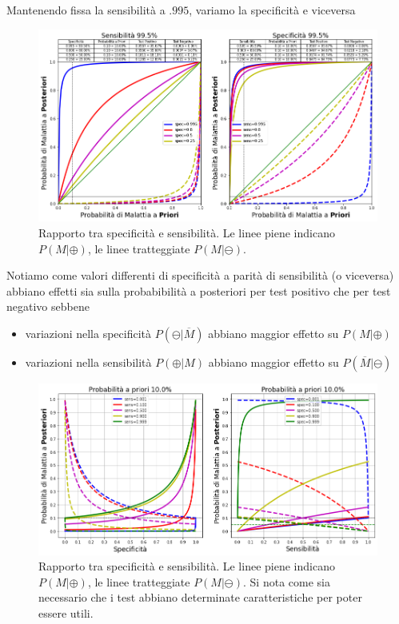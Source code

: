 \documentclass[11pt]{article}
\providecommand{\tightlist}{%
      \setlength{\itemsep}{0pt}\setlength{\parskip}{0pt}}
\begin{document}
    Mantenendo fissa la sensibilità a \(.995\), variamo la specificità e
viceversa

    
        \begin{figure}
        \centering
            \includegraphics{sens-spec.png}
            \caption{Rapporto tra specificità e sensibilità. Le linee piene indicano $P(M|\oplus)$, le linee tratteggiate $P(M|\ominus).$}
            \label{fig:sens-spec}
        \end{figure}

    
    Notiamo come valori differenti di specificità a parità di sensibilità (o
viceversa) abbiano effetti sia sulla probabibilità a posteriori per test
positivo che per test negativo sebbene

\begin{itemize}
\tightlist
\item
  variazioni nella specificità \(P(\ominus|\overline{M})\) abbiano
  maggior effetto su \(P(M|\oplus)\)
\item
  variazioni nella sensibilità \(P(\oplus|M)\) abbiano maggior effetto
  su \(P(\overline{M}|\ominus)\)
\end{itemize}

    
        \begin{figure}
        \centering
            \includegraphics{sens-spec-2.png}
            \caption{Rapporto tra specificità e sensibilità. Le linee piene indicano $P(M|\oplus)$, le linee tratteggiate $P(M|\ominus).$ Si nota come sia necessario che i test abbiano determinate caratteristiche per poter essere utili.}
            \label{fig:sens-spec-2}
        \end{figure}
\end{document}
